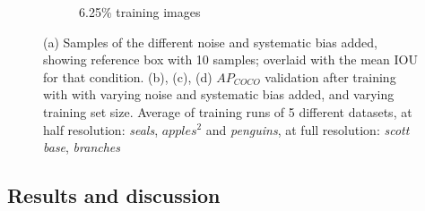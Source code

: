 \begin{figure}[phbt!]
\begin{subfigure}[t]{0.5\linewidth}
  \caption{6.25\% training images}
\end{subfigure}
  \caption{ (a) Samples of the different noise and systematic bias added, showing reference box with 10 samples; overlaid with the mean \gls{IOU} for that condition. (b), (c), (d) $AP_{COCO}$ validation after training with with varying noise and systematic bias added, and varying training set size. Average of training runs of 5 different datasets, at half resolution: \emph{seals}, $apples^2$ and \emph{penguins}, at full resolution: \emph{scott base}, \emph{branches}}
  \label{fig:noisy_training}
\end{figure}

\subsection{Results and discussion}

